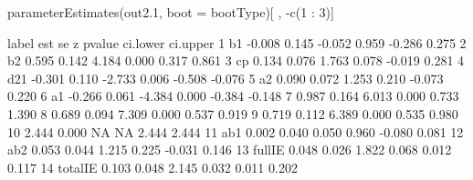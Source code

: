 \begin{Schunk}
\begin{Sinput}
 parameterEstimates(out2.1, boot = bootType)[ , -c(1 : 3)]
\end{Sinput}
\begin{Soutput}
     label    est    se      z pvalue ci.lower ci.upper
1       b1 -0.008 0.145 -0.052  0.959   -0.286    0.275
2       b2  0.595 0.142  4.184  0.000    0.317    0.861
3       cp  0.134 0.076  1.763  0.078   -0.019    0.281
4      d21 -0.301 0.110 -2.733  0.006   -0.508   -0.076
5       a2  0.090 0.072  1.253  0.210   -0.073    0.220
6       a1 -0.266 0.061 -4.384  0.000   -0.384   -0.148
7           0.987 0.164  6.013  0.000    0.733    1.390
8           0.689 0.094  7.309  0.000    0.537    0.919
9           0.719 0.112  6.389  0.000    0.535    0.980
10          2.444 0.000     NA     NA    2.444    2.444
11     ab1  0.002 0.040  0.050  0.960   -0.080    0.081
12     ab2  0.053 0.044  1.215  0.225   -0.031    0.146
13  fullIE  0.048 0.026  1.822  0.068    0.012    0.117
14 totalIE  0.103 0.048  2.145  0.032    0.011    0.202
\end{Soutput}
\end{Schunk}
